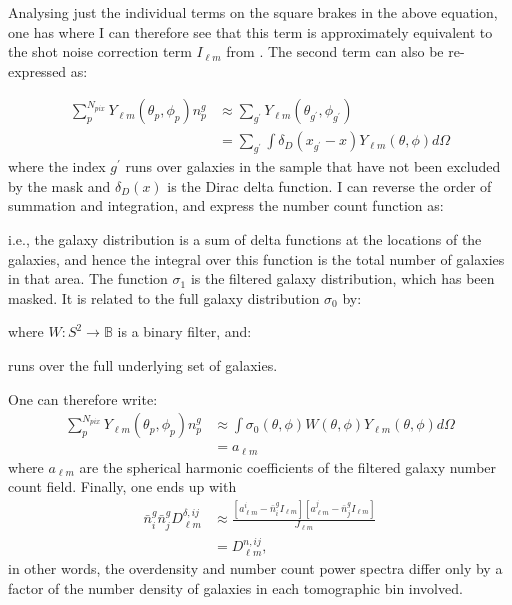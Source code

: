 \qquad Analysing just the individual terms on the square brakes in the above equation, one has
where I can therefore see that this term is approximately equivalent to the shot noise correction term $I_{\ell m}$ from \cite{Blake2007,Thomas2011}. The second term can also be re-expressed as:

\begin{align}
\sum_p^{N_{pix}} Y_{\ell m}(\theta_p,\phi_p) n_p^g &\approx \sum_{g^\prime} Y_{\ell m}(\theta_{g^\prime},\phi_{g^\prime}) \\ \nonumber
								&= \sum_{g^\prime} \int \delta_D(x_{g^\prime}-x) Y_{\ell m}(\theta,\phi) d\Omega
\end{align}
\noindent where the index $g^\prime$ runs over galaxies in the sample that have not been excluded by the mask and $\delta_D(x)$ is the Dirac delta function. I can reverse the order of summation and integration, and express the number count function as:

\noindent i.e., the galaxy distribution is a sum of delta functions at the locations of the galaxies, and hence the integral over this function is the total number of galaxies in that area. The function $\sigma_1$ is the filtered galaxy distribution, which has been masked. It is related to the full galaxy distribution $\sigma_0$ by:

\noindent where $W: S^2 \rightarrow \mathbb{B}$ is a binary filter, and:


\noindent runs over the full underlying set of galaxies.

\qquad One can therefore write:
\begin{align}
\sum_p^{N_{pix}} Y_{\ell m}(\theta_p,\phi_p)n_p^g  & \approx \int \sigma_0(\theta,\phi)W(\theta,\phi)Y_{\ell m}(\theta,\phi)d\Omega \\ & = a_{\ell m}
\end{align}
\noindent where $a_{\ell m}$ are the spherical harmonic coefficients of the filtered galaxy number count field. Finally, one ends up with 
\begin{align}
\bar n^g_i \bar n^g_j D^{\delta, ij}_{\ell m} & \approx  \frac{\left[ a_{\ell m}^i - \bar n_i^g I_{\ell m} \right] \left[ a_{\ell m}^j - \bar n_j^g I_{\ell m} \right]}{J_{\ell m}} \\ & = D^{n,ij}_{\ell m},
\end{align}
in other words, the overdensity and number count power spectra differ only by a factor of the number density of galaxies in each tomographic bin involved.


